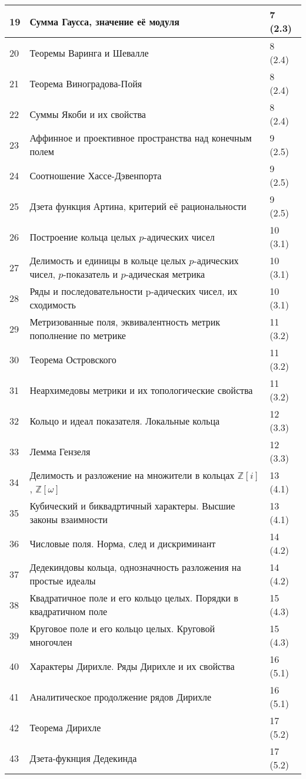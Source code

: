 \documentclass[a4paper, 12pt]{article}
\begin{document}
\begin{longtable}{ | p{0.8cm} | p{11cm} | p{2cm} | }
    19 & Сумма Гаусса, значение её модуля & 7 (2.3) \\ \hline
    20 & Теоремы Варинга и Шевалле & 8 (2.4) \\ \hline
    21 & Теорема Виноградова-Пойя & 8 (2.4) \\ \hline
    22 & Суммы Якоби и их свойства & 8 (2.4) \\ \hline
    23 & Аффинное и проективное пространства над конечным полем & 9 (2.5) \\ \hline
    24 & Соотношение Хассе-Дэвенпорта & 9 (2.5) \\ \hline
    25 & Дзета функция Артина, критерий её рациональности & 9 (2.5) \\ \hline
    26 & Построение кольца целых $p$-адических чисел & 10 (3.1) \\ \hline
    27 & Делимость и единицы в кольце целых $p$-адических чисел, $p$-показатель и $p$-адическая метрика & 10 (3.1) \\ \hline
    28 & Ряды и последовательности p-адических чисел, их сходимость & 10 (3.1) \\ \hline
    29 & Метризованные поля, эквивалентность метрик пополнение по метрике & 11 (3.2) \\ \hline
    30 & Теорема Островского & 11 (3.2) \\ \hline
    31 & Неархимедовы метрики и их топологические свойства & 11 (3.2) \\ \hline
    32 & Кольцо и идеал показателя. Локальные кольца & 12 (3.3) \\ \hline
    33 & Лемма Гензеля & 12 (3.3) \\ \hline
    34 & Делимость и разложение на множители в кольцах $\mathbb{Z}[i]$, $\mathbb{Z}[\omega]$ & 13 (4.1) \\ \hline
    35 & Кубический и биквадртичный характеры. Высшие законы взаимности & 13 (4.1) \\ \hline
    36 & Числовые поля. Норма, след и дискриминант & 14 (4.2) \\ \hline
    37 & Дедекиндовы кольца, однозначность разложения на простые идеалы & 14 (4.2) \\ \hline
    38 & Квадратичное поле и его кольцо целых. Порядки в квадратичном поле & 15 (4.3) \\ \hline
    39 & Круговое поле и его кольцо целых. Круговой многочлен & 15 (4.3) \\ \hline
    40 & Характеры Дирихле. Ряды Дирихле и их свойства & 16 (5.1) \\ \hline
    41 & Аналитическое продолжение рядов Дирихле & 16 (5.1) \\ \hline
    42 & Теорема Дирихле & 17 (5.2) \\ \hline
    43 & Дзета-фукнция Дедекинда & 17 (5.2) \\ \hline

\end{longtable}
\end{document}
